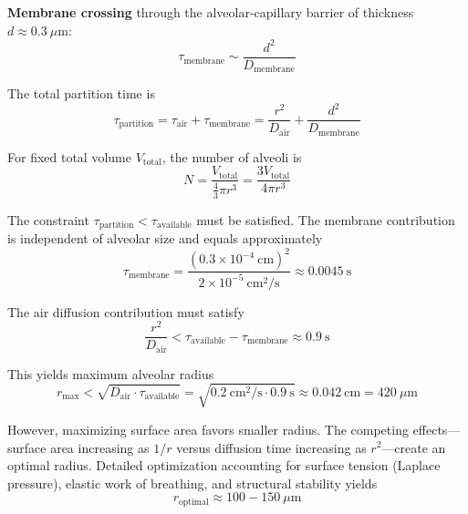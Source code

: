 \textbf{Membrane crossing} through the alveolar-capillary barrier of thickness $d \approx 0.3~\mu$m:
\begin{equation}
\tau_{\mathrm{membrane}} \sim \frac{d^{2}}{D_{\mathrm{membrane}}}
\end{equation}

The total partition time is
\begin{equation}
\tau_{\mathrm{partition}} = \tau_{\mathrm{air}} + \tau_{\mathrm{membrane}} = \frac{r^{2}}{D_{\mathrm{air}}} + \frac{d^{2}}{D_{\mathrm{membrane}}}
\end{equation}

For fixed total volume $V_{\mathrm{total}}$, the number of alveoli is
\begin{equation}
N = \frac{V_{\mathrm{total}}}{\frac{4}{3}\pi r^{3}} = \frac{3V_{\mathrm{total}}}{4\pi r^{3}}
\end{equation}

The constraint $\tau_{\mathrm{partition}} < \tau_{\mathrm{available}}$ must be satisfied. The membrane contribution is independent of alveolar size and equals approximately
\begin{equation}
\tau_{\mathrm{membrane}} = \frac{(0.3 \times 10^{-4}~\mathrm{cm})^{2}}{2 \times 10^{-5}~\mathrm{cm}^{2}/\mathrm{s}} \approx 0.0045~\mathrm{s}
\end{equation}

The air diffusion contribution must satisfy
\begin{equation}
\frac{r^{2}}{D_{\mathrm{air}}} < \tau_{\mathrm{available}} - \tau_{\mathrm{membrane}} \approx 0.9~\mathrm{s}
\end{equation}

This yields maximum alveolar radius
\begin{equation}
r_{\mathrm{max}} < \sqrt{D_{\mathrm{air}} \cdot \tau_{\mathrm{available}}} = \sqrt{0.2~\mathrm{cm}^{2}/\mathrm{s} \cdot 0.9~\mathrm{s}} \approx 0.042~\mathrm{cm} = 420~\mu\mathrm{m}
\end{equation}

However, maximizing surface area favors smaller radius. The competing effects—surface area increasing as $1/r$ versus diffusion time increasing as $r^{2}$—create an optimal radius. Detailed optimization accounting for surface tension (Laplace pressure), elastic work of breathing, and structural stability yields
\begin{equation}
r_{\mathrm{optimal}} \approx 100-150~\mu\mathrm{m}
\end{equation}

